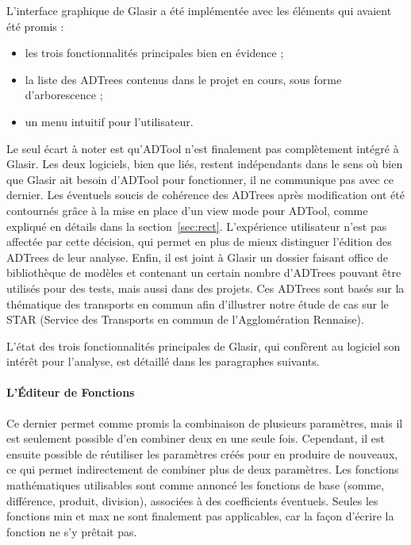 L'interface graphique de Glasir a été implémentée avec les éléments qui avaient été promis : 
\begin{itemize}
    \item les trois fonctionnalités principales  bien en évidence ;
    \item la liste des ADTrees contenus dans le projet en cours, sous forme d'arborescence ;
    \item un menu intuitif pour l'utilisateur.
\end{itemize}
Le seul écart à noter est qu'ADTool n'est finalement pas complètement intégré à Glasir. Les deux logiciels, bien que liés, restent indépendants dans le sens où bien que Glasir ait besoin d'ADTool pour fonctionner, il ne communique pas avec ce dernier. Les éventuels soucis de cohérence des ADTrees après modification ont été contournés grâce à la mise en place d'un \og view mode \fg{} pour ADTool, comme expliqué en détails dans la {\sc section}~\ref{sec:rect}. L'expérience utilisateur n'est pas affectée par cette décision, qui permet en plus de mieux distinguer l'édition des ADTrees de leur analyse. Enfin, il est joint à Glasir un dossier faisant office de bibliothèque de modèles et contenant un certain nombre d'ADTrees pouvant être utilisés pour des tests, mais aussi dans des projets. Ces ADTrees sont basés sur la thématique des transports en commun afin d'illustrer notre étude de cas sur le STAR (Service des Transports en commun de l'Agglomération Rennaise).

L'état des trois fonctionnalités principales de Glasir, qui confèrent au logiciel son intérêt pour l'analyse, est détaillé dans les paragraphes suivants.

\paragraph{L'Éditeur de Fonctions} Ce dernier permet comme promis la combinaison de plusieurs paramètres, mais il est seulement possible d'en combiner deux en une seule fois. Cependant, il est ensuite possible de réutiliser les paramètres créés pour en produire de nouveaux, ce qui permet indirectement de combiner plus de deux paramètres. Les fonctions mathématiques utilisables sont comme annoncé les fonctions de base (somme, différence, produit, division), associées à des coefficients éventuels. Seules les fonctions min et max ne sont finalement pas applicables, car la façon d'écrire la fonction ne s'y prêtait pas.

